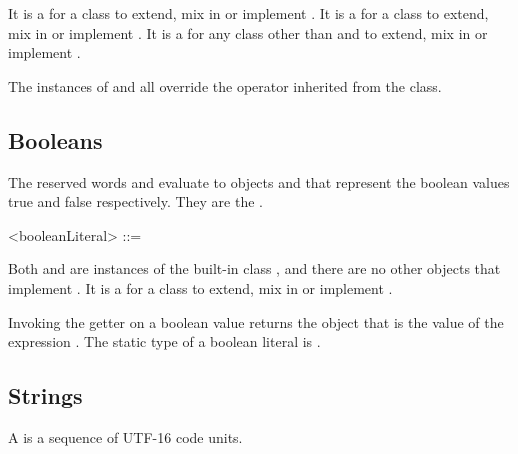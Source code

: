 \documentclass[makeidx]{article}
\begin{document}
{\LMHash{}%
It is a  for a class to extend, mix in or implement
.
It is a  for a class to extend, mix in or implement
.
It is a  for any class
other than  and  to extend, mix in or implement
.

\LMHash{}%
The instances of  and  all override
the \lit{==} operator inherited from the  class.


\subsection{Booleans}

\LMHash{}%
The reserved words \TRUE{} and \FALSE{} evaluate to objects
 and
that represent the boolean values true and false respectively.
They are the .

\begin{grammar}
<booleanLiteral> ::= \TRUE{}
  \alt \FALSE{}
\end{grammar}

\LMHash{}%
Both  and  are instances of
the built-in class ,
and there are no other objects that implement .
It is a  for a class to
extend, mix in or implement .


\LMHash{}%
Invoking the getter  on a boolean value returns
the  object that is the value of the expression .
The static type of a boolean literal is .


\subsection{Strings}

\LMHash{}%
A  is a sequence of UTF-16 code units.


}
\end{document}

